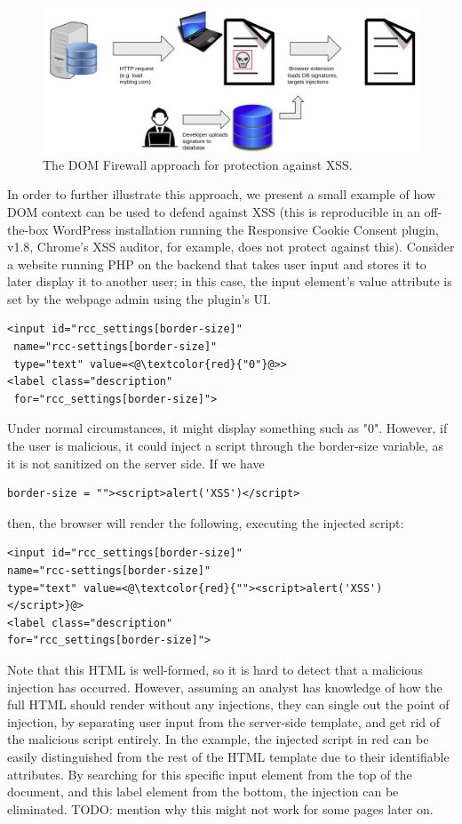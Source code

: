  \begin{figure}[h]
 	\includegraphics[scale=0.23]{img/dom_firewall.png}
 	\caption{The DOM Firewall approach for protection against XSS.}
 	\label{fig:dom_firewall}
 \end{figure}

In order to further illustrate this approach, we present a small example of how DOM context can be used to defend against XSS (this is reproducible in an off-the-box WordPress installation running the Responsive Cookie Consent plugin, v1.8, Chrome's XSS auditor, for example, does not protect against this). Consider a website running PHP on the backend that takes user input and stores it to later display it to another user; in this case, the input element's value attribute is set by the webpage admin using the plugin's UI.
\\
\begin{lstlisting}
<input id="rcc_settings[border-size]" 
 name="rcc-settings[border-size]" 
 type="text" value=<@\textcolor{red}{"0"}@>>
<label class="description"
 for="rcc_settings[border-size]">
\end{lstlisting}
Under normal circumstances, it might display something such as "0". However, if the user is malicious, it could inject a script through the border-size variable, as it is not sanitized on the server side. If we have
\begin{lstlisting}
border-size = ""><script>alert('XSS')</script>
\end{lstlisting}
then, the browser will render the following, executing the injected script:
\begin{lstlisting}
<input id="rcc_settings[border-size]" 
name="rcc-settings[border-size]" 
type="text" value=<@\textcolor{red}{""><script>alert('XSS')</script>}@>
<label class="description"
for="rcc_settings[border-size]">
\end{lstlisting}

Note that this HTML is well-formed, so it is hard to detect that a malicious injection has occurred. However, assuming an analyst has knowledge of how the full HTML should render without any injections, they can single out the point of injection, by separating user input from the server-side template, and get rid of the malicious script entirely. In the example, the injected script in red can be easily distinguished from the rest of the HTML template due to their identifiable attributes. By searching for this specific input element from the top of the document, and this label element from the bottom, the injection can be eliminated. TODO: mention why this might not work for some pages later on. 

